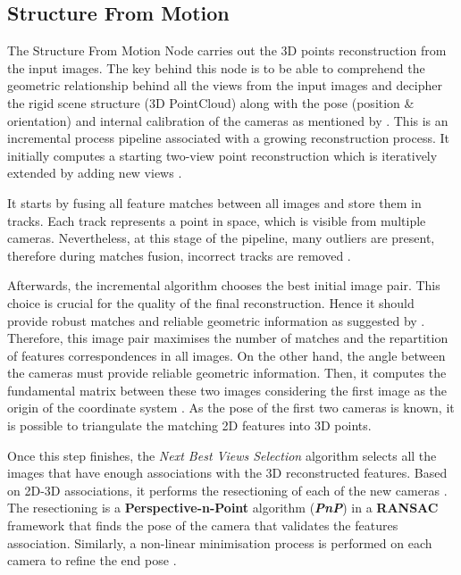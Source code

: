 \documentclass[12pt]{report}
\begin{document}
      
\subsection{Structure From Motion}

The Structure From Motion Node carries out the 3D points reconstruction from the input images. The key behind this node is to be able to comprehend
the geometric relationship behind all the views from the input images and decipher the rigid scene structure (3D PointCloud) along with the pose (position \& orientation) and internal calibration of the cameras as mentioned by .
This is an incremental process pipeline associated with a growing reconstruction process. It initially computes a starting two-view point reconstruction which is iteratively extended by adding new views .

It starts by fusing all feature matches between all images and store them in tracks. Each track represents a point in space, which is visible from multiple cameras. 
Nevertheless, at this stage of the pipeline, many outliers are present, therefore during matches fusion, incorrect tracks are removed \citep*{Fischler1981RandomSC}.

Afterwards, the incremental algorithm chooses the best initial image pair. This choice is crucial for the quality of the final reconstruction. Hence it should provide robust matches and reliable geometric information as suggested by \citet*{Moulon2012}.
Therefore, this image pair maximises the number of matches and the repartition of features correspondences in all images. On the other hand, the angle between the cameras must provide reliable geometric information.
Then, it computes the fundamental matrix between these two images considering the first image as the origin of the coordinate system . As the pose of the first two cameras is known, 
it is possible to triangulate the matching 2D features into 3D points. 

Once this step finishes, the \textit{Next Best Views Selection} algorithm selects all the images that have enough associations with the 3D reconstructed features.
Based on 2D-3D associations, it performs the resectioning of each of the new cameras \citep*{Lepetit2008EPnPAA}. The resectioning is a \textbf{Perspective-n-Point} algorithm (\textbf{\textit{PnP}}) in a
\textbf{RANSAC} framework that finds the pose of the camera that validates the features association. Similarly, a non-linear minimisation process is performed on each camera to refine the end pose \citep*{Nister2004}.
\end{document}
